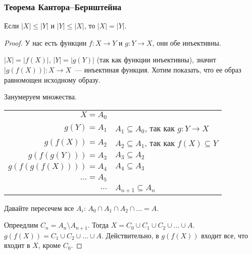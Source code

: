 \subsubsection{Теорема Кантора--Бернштейна}
\begin{theorem}
    Если $|X| \leqslant |Y|$ и $|Y| \leqslant |X|$, то $|X| = |Y|$.
\end{theorem}
\begin{proof}
    У нас есть функции $f: X \to Y$ и $g:Y \to X$, они обе инъективны.

    \begin{center}
    \end{center}

    $|X| = |f(X)|$, $|Y| = |g(Y)|$ (так как функции инъективны), значит $|g(f(X))|: X \to X$~--- инъектиная функция. Хотим показать, что ее образ равномощен исходному образу.

    Занумеруем множества.

    \begin{tabular}{r l}
$X = A_0$ & \\
$g(Y) = A_1$ & $A_1 \subseteq A_0$, так как $g: Y \to X$\\
$g(f(X)) = A_2$ & $A_2\subseteq A_1$, так как $f(X) \subseteq Y$\\
$g(f(g(Y))) = A_3$ & $A_3 \subseteq A_2$\\
$g(f(g(f(X)))) = A_4$ & $A_4 \subseteq A_3$\\
$\dots = A_5$ & \\
$\dots$ & $A_{n+1}\subseteq A_n$
    \end{tabular}

Давайте пересечем все $A_i$: $A_0 \cap A_1 \cap A_2 \cap \dots = A$.

Опреедлим $C_n = A_n \setminus A_{n+1}$. Тогда $X = C_0 \cup C_1 \cup C_2 \cup \dots \cup A $. $g(f(X)) = C_1 \cup C_2 \cup \dots \cup A$. Действительно, в $g(f(X))$ входит все, что входит в $X$, кроме $C_0$.


\end{proof}

